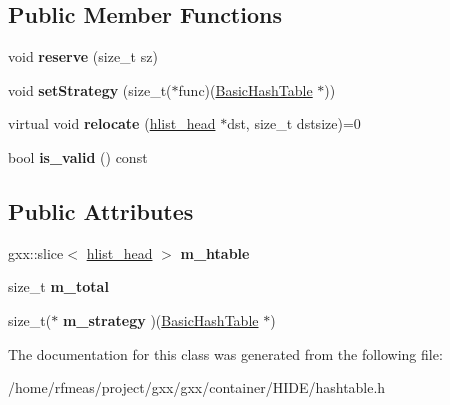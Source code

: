 \subsection*{Public Member Functions}
\begin{DoxyCompactItemize}
\item 
void {\bfseries reserve} (size\+\_\+t sz)\hypertarget{classgxx_1_1BasicHashTable_a5778618b022b2f41b41ffa798db67dc2}{}\label{classgxx_1_1BasicHashTable_a5778618b022b2f41b41ffa798db67dc2}

\item 
void {\bfseries set\+Strategy} (size\+\_\+t($\ast$func)(\hyperlink{classgxx_1_1BasicHashTable}{Basic\+Hash\+Table} $\ast$))\hypertarget{classgxx_1_1BasicHashTable_af96db4e1ec70d7fd04c92fd842318306}{}\label{classgxx_1_1BasicHashTable_af96db4e1ec70d7fd04c92fd842318306}

\item 
virtual void {\bfseries relocate} (\hyperlink{structhlist__head}{hlist\+\_\+head} $\ast$dst, size\+\_\+t dstsize)=0\hypertarget{classgxx_1_1BasicHashTable_aff55d217bdc65f9987d7bdfbefce7965}{}\label{classgxx_1_1BasicHashTable_aff55d217bdc65f9987d7bdfbefce7965}

\item 
bool {\bfseries is\+\_\+valid} () const \hypertarget{classgxx_1_1BasicHashTable_afe34c280a75f30939d00a17b5036eb87}{}\label{classgxx_1_1BasicHashTable_afe34c280a75f30939d00a17b5036eb87}

\end{DoxyCompactItemize}
\subsection*{Public Attributes}
\begin{DoxyCompactItemize}
\item 
gxx\+::slice$<$ \hyperlink{structhlist__head}{hlist\+\_\+head} $>$ {\bfseries m\+\_\+htable}\hypertarget{classgxx_1_1BasicHashTable_ac34d8677dfeaa91be07dca449dfdf238}{}\label{classgxx_1_1BasicHashTable_ac34d8677dfeaa91be07dca449dfdf238}

\item 
size\+\_\+t {\bfseries m\+\_\+total}\hypertarget{classgxx_1_1BasicHashTable_a039e3aacf067662d55448e90aadf8cd6}{}\label{classgxx_1_1BasicHashTable_a039e3aacf067662d55448e90aadf8cd6}

\item 
size\+\_\+t($\ast$ {\bfseries m\+\_\+strategy} )(\hyperlink{classgxx_1_1BasicHashTable}{Basic\+Hash\+Table} $\ast$)\hypertarget{classgxx_1_1BasicHashTable_ad1bcb87e0a019fcc8a72f862e0f7fde3}{}\label{classgxx_1_1BasicHashTable_ad1bcb87e0a019fcc8a72f862e0f7fde3}

\end{DoxyCompactItemize}


The documentation for this class was generated from the following file\+:\begin{DoxyCompactItemize}
\item 
/home/rfmeas/project/gxx/gxx/container/\+H\+I\+D\+E/hashtable.\+h\end{DoxyCompactItemize}
